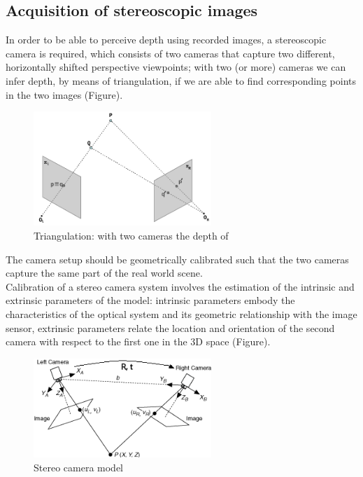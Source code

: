 \subsection{Acquisition of stereoscopic images}

In order to be able to perceive depth using recorded images, a stereoscopic camera is required,
which consists of two cameras that capture two different, horizontally shifted perspective
viewpoints; with two (or more) cameras we can infer depth, by means of triangulation, if we are able to find corresponding points in the two images (Figure).\\
\begin{figure}[h!]
\centering
\includegraphics[width=0.6\textwidth]{./img/correspondance.png}
\caption{\small{Triangulation: with two cameras the depth of }}
\label{fig:corr}
\end{figure}
 The camera setup should be geometrically
calibrated such that the two cameras capture the same part of the real world scene.\\
Calibration of a stereo camera system involves the estimation of the intrinsic and extrinsic parameters of the model: intrinsic parameters embody the characteristics of the optical system and its geometric relationship with the image sensor, extrinsic parameters relate the location and orientation of the second camera with respect to the first one in the 3D space (Figure).\\
\begin{figure}[h!]
\centering
\includegraphics[width=0.6\textwidth]{./img/stereo_system.png}
\caption{\small{Stereo camera model}}
\label{fig:rt}
\end{figure}
